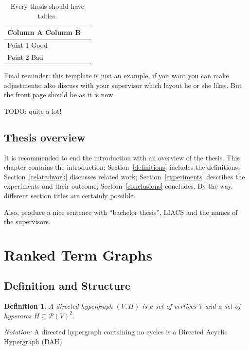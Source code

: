 \documentclass[12pt]{article}
\newtheorem{definition}{Definition}[section]
\renewcommand{\P}{\mathcal{P}}
\newcommand{\1}{\mathbbm{1}}
\begin{document}
\begin{table}[!htbp]
\begin{center}
\begin{tabular}{l|l}
Column A  Column B\\
\hline
Point 1  Good\\
Point 2  Bad
\end{tabular}
\end{center}
\caption{Every thesis should have tables.}\label{atable}
\end{table}

Final reminder: this template is just an example, if you want you can make adjustments; also discuss with your supervisor which layout he or she likes. But the front page should be as it is now.

TODO: quite a lot!

\subsection{Thesis overview}
It is recommended to end the introduction with an overview of the thesis. This chapter contains the introduction; Section~\ref{definitions} includes the definitions; Section~\ref{relatedwork} discusses related work; Section~\ref{experiments} describes the experiments and their outcome; Section~\ref{conclusions} concludes. By the way, different section titles are certainly possible.

Also, produce a nice sentence with ``bachelor thesis'', LIACS and the names of the supervisors.
\section{Ranked Term Graphs}

\subsection{Definition and Structure}
\begin{definition}
    A directed \emph{hypergraph} $(V,H)$ is a set of vertices $V$ and a set of \emph{hyperarcs} $H\subseteq \P(V)^2$.
\end{definition}

\emph{Notation:} A directed hypergraph containing no cycles is a Directed Acyclic Hypergraph (DAH)\\
\end{document}
